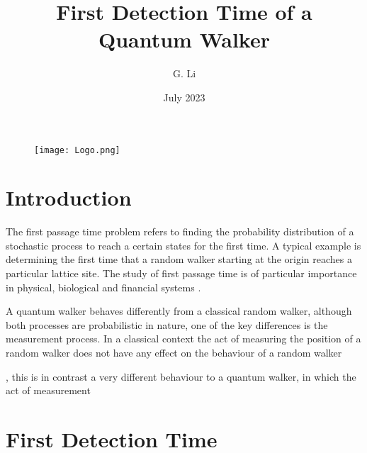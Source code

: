 \documentclass{article}
\title{First Detection Time of a Quantum Walker}
\author{G. Li}
\date{July 2023}
\numberwithin{equation}{section}
\newcommand{\1}{\mathbb{1}}
\begin{document}
\begin{figure}
    \centering
    \texttt{[image: Logo.png]}
\end{figure}
\maketitle
\newpage
\tableofcontents
\newpage
\section{Introduction}
The first passage time problem refers to finding the probability distribution of a stochastic process to reach a certain states for the first time. A typical example is determining the first time that a random walker starting at the origin reaches a particular lattice site. The study of first passage time is of particular importance in physical, biological and financial systems \cite{}.




A quantum walker behaves differently from a classical random walker, although both processes are probabilistic in nature, one of the key differences is the measurement process. In a classical context the act of measuring the position of a random walker does not have any effect on the behaviour of a random walker




, this is in contrast a very different behaviour to a quantum walker, in which the act of measurement 
\section{First Detection Time}
\end{document}
